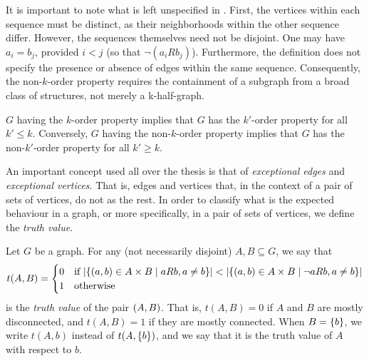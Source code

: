         \begin{remark}
            It is important to note what is left unspecified in .
            First, the vertices within each sequence must be distinct, as their neighborhoods within the other sequence
            differ.
            However, the sequences themselves need not be disjoint.
            One may have $a_i=b_j$, provided $i < j$ (so that $\neg(a_i R b_j)$).
            Furthermore, the definition does not specify the presence or absence of edges within the same sequence.
            Consequently, the non-$k$-order property requires the containment of a subgraph from a broad class of structures,
            not merely a k-half-graph.
        \end{remark}

        \begin{remark}
            $G$ having the $k$-order property implies that $G$ has the $k'$-order property for all $k' \leq k$.
            Conversely, $G$ having the non-$k$-order property implies that $G$ has the non-$k'$-order property for all $k' \geq k$.
        \end{remark}

        An important concept used all over the thesis is that of \emph{exceptional edges} and \emph{exceptional vertices}.
        That is, edges and vertices that, in the context of a pair of sets of vertices, do not  as the rest.
        In order to classify what is the expected behaviour in a graph, or more specifically, in a pair of sets of vertices,
        we define the \emph{truth value}.

        \begin{definition} \label{def:truth_value}
            Let $G$ be a graph.
            For any (not necessarily disjoint) $A, B \subseteq G$, we say that
            \[
                t(A,B) =
                \begin{cases}
                    0 & \text{if } | \{ ( a, b ) \in A \times B \mid a R b, a \neq b \} | <
                        | \{ ( a, b ) \in A \times B \mid \neg a R b, a \neq b \} | \\
                    1 & \text{otherwise}
                \end{cases}
            \]
            is the \emph{truth value} of the pair $( A,B )$.
            That is, $t(A,B) = 0$ if $A$ and $B$ are mostly disconnected, and $t(A,B) = 1$ if they are mostly connected.
            When $B = \{ b \}$, we write $t(A,b)$ instead of $t(A,\{ b \})$, and we say that it is the truth value of $A$
            with respect to $b$.
        \end{definition}

